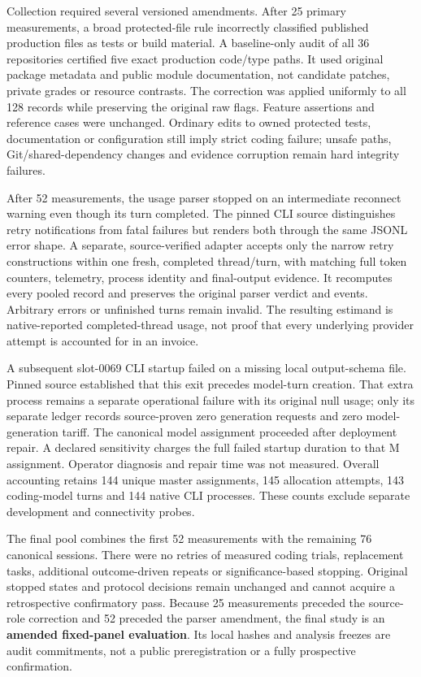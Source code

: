 \documentclass[manuscript,screen,nonacm]{acmart}
\begin{document}
Collection required several versioned amendments. After 25 primary
measurements, a broad protected-file rule incorrectly classified
published production files as tests or build material. A baseline-only
audit of all 36 repositories certified five exact production code/type
paths. It used original package metadata and public module
documentation, not candidate patches, private grades or resource
contrasts. The correction was applied uniformly to all 128 records while
preserving the original raw flags. Feature assertions and reference
cases were unchanged. Ordinary edits to owned protected tests,
documentation or configuration still imply strict coding failure; unsafe
paths, Git/shared-dependency changes and evidence corruption remain hard
integrity failures.

After 52 measurements, the usage parser stopped on an intermediate
reconnect warning even though its turn completed. The pinned CLI source
distinguishes retry notifications from fatal failures but renders both
through the same JSONL error shape. A separate, source-verified adapter
accepts only the narrow retry constructions within one fresh, completed
thread/turn, with matching full token counters, telemetry, process
identity and final-output evidence. It recomputes every pooled record
and preserves the original parser verdict and events. Arbitrary errors
or unfinished turns remain invalid. The resulting estimand is
native-reported completed-thread usage, not proof that every underlying
provider attempt is accounted for in an invoice.

A subsequent slot-0069 CLI startup failed on a missing local
output-schema file. Pinned source established that this exit precedes
model-turn creation. That extra process remains a separate operational
failure with its original null usage; only its separate ledger records
source-proven zero generation requests and zero model-generation tariff.
The canonical model assignment proceeded after deployment repair. A
declared sensitivity charges the full failed startup duration to that M
assignment. Operator diagnosis and repair time was not measured. Overall
accounting retains 144 unique master assignments, 145 allocation
attempts, 143 coding-model turns and 144 native CLI processes. These
counts exclude separate development and connectivity probes.

The final pool combines the first 52 measurements with the remaining 76
canonical sessions. There were no retries of measured coding trials,
replacement tasks, additional outcome-driven repeats or
significance-based stopping. Original stopped states and protocol
decisions remain unchanged and cannot acquire a retrospective
confirmatory pass. Because 25 measurements preceded the source-role
correction and 52 preceded the parser amendment, the final study is an
\textbf{amended fixed-panel evaluation}. Its local hashes and analysis
freezes are audit commitments, not a public preregistration or a fully
prospective confirmation.
\end{document}
